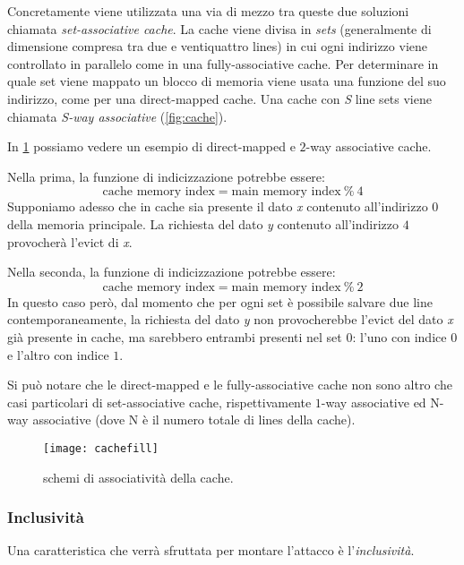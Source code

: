 				Concretamente viene utilizzata una via di mezzo tra queste due soluzioni chiamata \emph{set-associative cache}. La cache viene divisa in \emph{sets} (generalmente di dimensione compresa tra due e ventiquattro lines) in cui ogni indirizzo viene controllato in parallelo come in una fully-associative cache. Per determinare in quale set viene mappato un blocco di memoria viene usata una funzione del suo indirizzo, come per una direct-mapped cache. Una cache con \emph{S} line sets viene chiamata \emph{S-way associative} (\cref{fig:cache}). 
				
				In \cref{fig:cachefill} possiamo vedere un esempio di direct-mapped e $2$-way associative cache. 
				
				Nella prima, la funzione di indicizzazione potrebbe essere: $$\text{cache memory index} = \text{main memory index}\ \% \ 4$$ Supponiamo adesso che in cache sia presente il dato \emph{x} contenuto all'indirizzo $0$ della memoria principale. La richiesta del dato \emph{y} contenuto all'indirizzo $4$ provocherà l'evict di \emph{x}.
				
				Nella seconda, la funzione di indicizzazione potrebbe essere: $$\text{cache memory index} = \text{main memory index}\ \% \ 2$$ In questo caso però, dal momento che per ogni set è possibile salvare due line contemporaneamente, la richiesta del dato \emph{y} non provocherebbe l'evict del dato \emph{x} già presente in cache, ma sarebbero entrambi presenti nel set $0$: l'uno con indice $0$ e l'altro con indice $1$.
				
				Si può notare che le direct-mapped e le fully-associative cache non sono altro che casi particolari di set-associative cache, rispettivamente $1$-way associative ed N-way associative (dove N è il numero totale di lines della cache).
				
				\begin{figure}
					\begin{center}
						\texttt{[image: cachefill]}
						\caption{schemi di associatività della cache.}
						\label{fig:cachefill}
					\end{center}
				\end{figure}
				
			\subsubsection{Inclusività}
				Una caratteristica che verrà sfruttata per montare l'attacco è l'\emph{inclusività}. 
				
